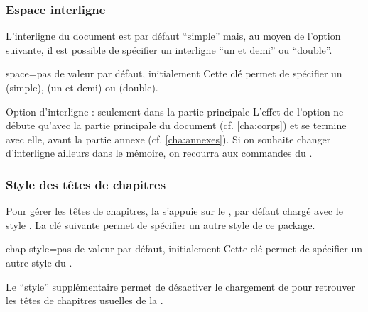 \subsubsection{Espace interligne}\label{sec:interligne}

L'interligne du document est par défaut \enquote{simple} mais, au
moyen de l'option  suivante, il est possible de
spécifier un interligne \enquote{un et demi} ou
\enquote{double}.

\begin{docKey}{space}{=\textbar{}\textbar{}}{pas de valeur par défaut,
    initialement }
  Cette clé permet de spécifier un  
  (simple),  (un et demi) ou  (double).
\end{docKey}

\begin{dbwarning}{Option d'interligne : seulement dans la partie
    principale}{}
  L'effet de l'option  ne débute qu'avec la partie principale du
  document (cf. \vref{cha:corps}) et se termine avec elle, avant la partie
  annexe (cf. \vref{cha:annexes}). Si on souhaite changer d'interligne ailleurs
  dans le mémoire, on recourra aux commandes du 
  .
\end{dbwarning}

\subsubsection{Style des têtes de chapitres}\label{sec:style-des-tetes}

Pour gérer les têtes de chapitres, la \yatcl{} s'appuie sur le
, par défaut chargé avec le style . La
clé  suivante permet de spécifier un autre style de ce
package.
%
{%
  \begin{docKey}{chap-style}{=\textbar{}\textbar{}\textbar{}\textbar{}\textbar{}\textbar{}\textbar{}\textbar{}}{pas de valeur par défaut,
    initialement }
  Cette clé permet de spécifier un autre style du .

  Le \enquote{style} supplémentaire  permet de désactiver le
  chargement de  pour retrouver les têtes de
  chapitres usuelles de la .
\end{docKey}
}

